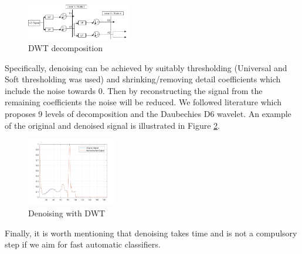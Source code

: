 \documentclass[a4paper,10pt,twocolumn]{article}
\begin{document}
\begin{figure}[ht]
     \centering
     \includegraphics[width=0.4\textwidth]{images/dwt_filt.png}
      \caption{DWT decomposition} 
      \label{fig:dwt_filt}
\end{figure}

Specifically, denoising can be achieved by suitably thresholding (Universal and Soft thresholding was used) and shrinking/removing detail coefficients which include the noise towards 0. Then by reconstructing the signal from the remaining coefficients the noise will be reduced. We followed literature \cite{elhaj2016arrhythmia} which proposes 9 levels of decomposition and the Daubechies D6 wavelet. An example of the original and denoised signal is illustrated in Figure \ref{fig:den}.

\begin{figure}[ht]
     \centering
     \includegraphics[width=0.35\textwidth]{images/pca.png}
      \caption{Denoising with DWT} 
      \label{fig:den}
\end{figure}

Finally, it is worth mentioning that denoising takes time and is not a compulsory step if we aim for fast automatic classifiers.



\end{document}
